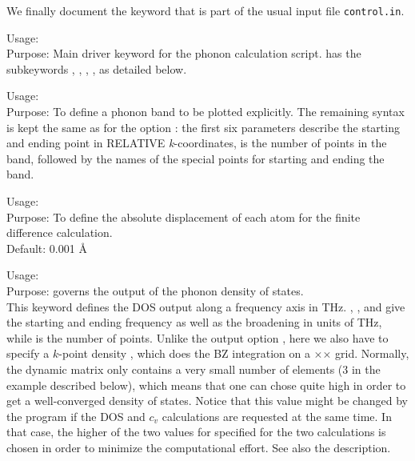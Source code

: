 We finally document the  keyword that is part of the
usual input file \texttt{control.in}. 

{
  Usage:  \\[1.0em]
  Purpose: Main driver keyword for the phonon calculation script. has
  the subkeywords ,
  , ,
  , as detailed below.\\ }

{ Usage:    \\[1.0em]
  Purpose: To define a phonon band to be plotted explicitly. The
  remaining syntax is kept the same as for the  option
  : the first six parameters describe the
  starting and ending point in RELATIVE \emph{k}-coordinates,
   is the number of points in the band, followed by
  the names of the special points for starting and ending the band. \\}

{ Usage:  
   \\[1.0em]
  Purpose: To define the absolute displacement of each atom for the
  finite difference calculation. \\[1.0em]
  Default: 0.001 \AA\\}

{ Usage:   \\[1.0em]
  Purpose: governs the output of the phonon density of states. \\ }
This keyword defines the DOS output along a frequency
axis in THz. , , and  give
the starting and ending frequency as well as the broadening in units
of THz, while  is the number of points. Unlike the
output option , here we also have to specify a
$k$-point density , which does the BZ integration on
a $\times$$\times$
grid. Normally, the dynamic matrix only contains a very small number
of elements (3 in the example described below), which means that one
can chose  quite high in order to get a
well-converged density of states. Notice that this value might be changed by the program
if the DOS and $c_v$ calculations are requested at the same time. In
that case, the higher of the two values for 
specified for the two calculations is chosen in order to minimize the
computational effort. See also the 
description. 

